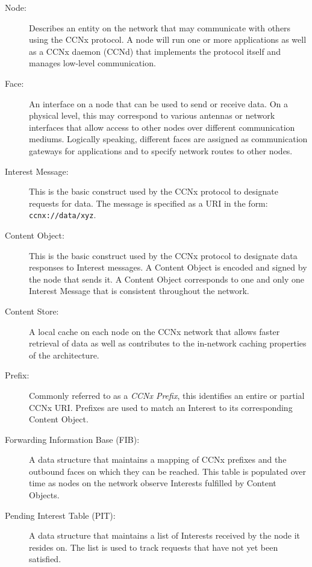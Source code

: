 \documentclass[a4paper,12pt]{report}      %
\begin{document}
\begin{description}
\item[Node:] Describes an entity on the network that may communicate with others using the CCNx protocol. A node will run one or more applications as well as a CCNx daemon (CCNd) that implements the protocol itself and manages low-level communication.

\item[Face:] An interface on a node that can be used to send or receive data. On a physical level, this may correspond to various antennas or network interfaces that allow access to other nodes over different communication mediums. Logically speaking, different faces are assigned as communication gateways for applications and to specify network routes to other nodes.

\item[Interest Message:] This is the basic construct used by the CCNx protocol to designate requests for data. The message is specified as a URI in the form: \verb!ccnx://data/xyz!. 

\item[Content Object:] This is the basic construct used by the CCNx protocol to designate data responses to Interest messages. A Content Object is encoded and signed by the node that sends it. A Content Object corresponds to one and only one Interest Message that is consistent throughout the network.

\item[Content Store:] A local cache on each node on the CCNx network that allows faster retrieval of data as well as contributes to the in-network caching properties of the architecture.

\item[Prefix:] Commonly referred to as a \emph{CCNx Prefix}, this identifies an entire or partial CCNx URI. Prefixes are used to match an Interest to its corresponding Content Object.

\item[Forwarding Information Base (FIB):] A data structure that maintains a mapping of CCNx prefixes and the outbound faces on which they can be reached. This table is populated over time as nodes on the network observe Interests fulfilled by Content Objects.

\item[Pending Interest Table (PIT):] A data structure that maintains a list of Interests received by the node it resides on. The list is used to track requests that have not yet been satisfied.

\end{description}
\end{document}
